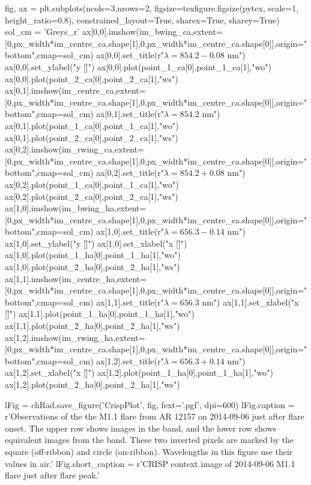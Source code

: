 \begin{pycode}[Radynversion]
fig, ax = plt.subplots(ncols=3,nrows=2,
figsize=texfigure.figsize(pytex, scale=1, height_ratio=0.8),
constrained_layout=True, sharex=True, sharey=True)
sol_cm = 'Greys_r'
ax[0,0].imshow(im_bwing_ca,extent=[0,px_width*im_centre_ca.shape[1],0,px_width*im_centre_ca.shape[0]],origin="bottom",cmap=sol_cm)
ax[0,0].set_title(r"$\lambda=854.2-0.08$ nm")
ax[0,0].set_ylabel("y [\"]")
ax[0,0].plot(point_1_ca[0],point_1_ca[1],"wo")
ax[0,0].plot(point_2_ca[0],point_2_ca[1],"ws")
ax[0,1].imshow(im_centre_ca,extent=[0,px_width*im_centre_ca.shape[1],0,px_width*im_centre_ca.shape[0]],origin="bottom",cmap=sol_cm)
ax[0,1].set_title(r"$\lambda=854.2$ nm")
ax[0,1].plot(point_1_ca[0],point_1_ca[1],"wo")
ax[0,1].plot(point_2_ca[0],point_2_ca[1],"ws")
ax[0,2].imshow(im_rwing_ca,extent=[0,px_width*im_centre_ca.shape[1],0,px_width*im_centre_ca.shape[0]],origin="bottom",cmap=sol_cm)
ax[0,2].set_title(r"$\lambda=854.2+0.08$ nm")
ax[0,2].plot(point_1_ca[0],point_1_ca[1],"wo")
ax[0,2].plot(point_2_ca[0],point_2_ca[1],"ws")
ax[1,0].imshow(im_bwing_ha,extent=[0,px_width*im_centre_ca.shape[1],0,px_width*im_centre_ca.shape[0]],origin="bottom",cmap=sol_cm)
ax[1,0].set_title(r"$\lambda=656.3-0.14$ nm")
ax[1,0].set_ylabel("y [\"]")
ax[1,0].set_xlabel("x [\"]")
ax[1,0].plot(point_1_ha[0],point_1_ha[1],"wo")
ax[1,0].plot(point_2_ha[0],point_2_ha[1],"ws")
ax[1,1].imshow(im_centre_ha,extent=[0,px_width*im_centre_ca.shape[1],0,px_width*im_centre_ca.shape[0]],origin="bottom",cmap=sol_cm)
ax[1,1].set_title(r"$\lambda=656.3$ nm")
ax[1,1].set_xlabel("x [\"]")
ax[1,1].plot(point_1_ha[0],point_1_ha[1],"wo")
ax[1,1].plot(point_2_ha[0],point_2_ha[1],"ws")
ax[1,2].imshow(im_rwing_ha,extent=[0,px_width*im_centre_ca.shape[1],0,px_width*im_centre_ca.shape[0]],origin="bottom",cmap=sol_cm)
ax[1,2].set_title(r"$\lambda=656.3+0.14$ nm")
ax[1,2].set_xlabel("x [\"]")
ax[1,2].plot(point_1_ha[0],point_1_ha[1],"wo")
ax[1,2].plot(point_2_ha[0],point_2_ha[1],"ws")

lFig = chRad.save_figure('CrispPlot', fig, fext='.pgf', dpi=600)
lFig.caption = r'Observations of the the M1.1 flare from AR 12157 on 2014-09-06 just after flare onset. The upper row shows images in the \CaLine{} band, and the lower row shows equivalent images from the \Ha{} band. These two inverted pixels are marked by the square (off-ribbon) and circle (on-ribbon). Wavelengths in this figure use their values in air.'
lFig.short_caption = r'CRISP context image of 2014-09-06 M1.1 flare just after flare peak.'
\end{pycode}

